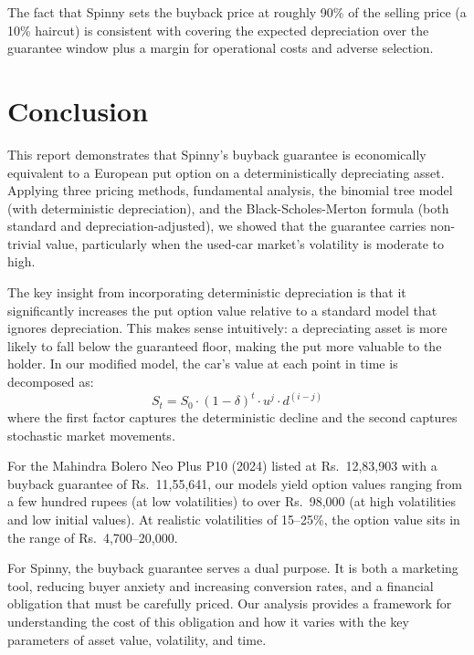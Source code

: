 \documentclass[11pt, a4paper]{article}
\begin{document}
The fact that Spinny sets the buyback price at roughly 90\% of the selling price (a 10\% haircut) is consistent with covering the expected depreciation over the guarantee window plus a margin for operational costs and adverse selection.


\section{Conclusion}
\label{sec:conclusion}

This report demonstrates that Spinny's buyback guarantee is economically equivalent to a European put option on a deterministically depreciating asset. Applying three pricing methods, fundamental analysis, the binomial tree model (with deterministic depreciation), and the Black-Scholes-Merton formula (both standard and depreciation-adjusted), we showed that the guarantee carries non-trivial value, particularly when the used-car market's volatility is moderate to high.

The key insight from incorporating deterministic depreciation is that it significantly increases the put option value relative to a standard model that ignores depreciation. This makes sense intuitively: a depreciating asset is more likely to fall below the guaranteed floor, making the put more valuable to the holder. In our modified model, the car's value at each point in time is decomposed as:
\[
S_t = S_0 \cdot (1 - \delta)^t \cdot u^j \cdot d^{(i-j)}
\]
where the first factor captures the deterministic decline and the second captures stochastic market movements.

For the Mahindra Bolero Neo Plus P10 (2024) listed at Rs.~12,83,903 with a buyback guarantee of Rs.~11,55,641, our models yield option values ranging from a few hundred rupees (at low volatilities) to over Rs.~98,000 (at high volatilities and low initial values). At realistic volatilities of 15--25\%, the option value sits in the range of Rs.~4,700--20,000.

For Spinny, the buyback guarantee serves a dual purpose. It is both a marketing tool, reducing buyer anxiety and increasing conversion rates, and a financial obligation that must be carefully priced. Our analysis provides a framework for understanding the cost of this obligation and how it varies with the key parameters of asset value, volatility, and time.


\end{document}
